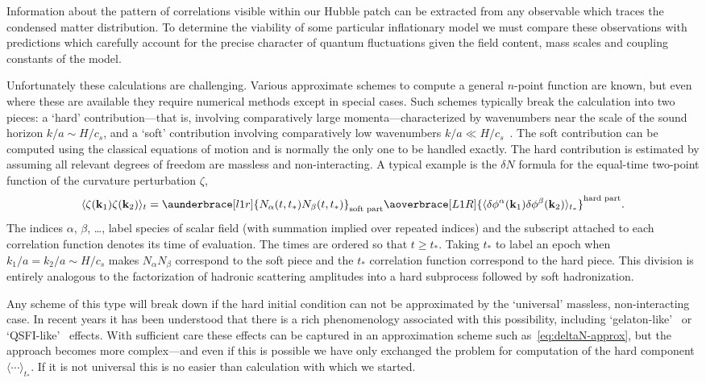 \documentclass[11pt,a4paper]{article}
\newcommand{\vect}[1]{\bm{\mathrm{{#1}}}}
\renewcommand{\geq}{\geqslant}
\begin{document}
Information about the pattern of correlations visible within our Hubble patch
can be extracted from any observable which traces the condensed matter
distribution.
To determine the viability of some particular inflationary model
we must compare these observations with predictions
which carefully account for the precise character of quantum
fluctuations given the field content, mass scales and coupling constants of the model.

Unfortunately these calculations are challenging.
Various
approximate schemes to compute a general $n$-point function are known,
but even where these are available they require numerical methods
except in special cases.
Such schemes typically break the calculation into two pieces:
a `hard' contribution---that is, involving comparatively
large momenta---characterized by wavenumbers near the scale
of the sound horizon $k/a \sim H / c_s$,
and a `soft' contribution involving comparatively low wavenumbers
$k/a \ll H / c_s$~\cite{Dias:2012qy}.
The soft contribution can be computed using the classical
equations of motion and is normally the only one to be handled exactly.
The hard contribution is estimated by assuming
all relevant degrees of freedom are massless and non-interacting.
A typical example is the $\delta N$ formula for the
equal-time two-point function
of the curvature perturbation $\zeta$,
\begin{equation}
    \langle \zeta(\vect{k}_1) \zeta(\vect{k}_2) \rangle_t
    = \aunderbrace[l1r]{N_\alpha(t, t_\ast) N_\beta(t, t_\ast)}_{\text{soft part}}
    \aoverbrace[L1R]{\langle \delta\phi^\alpha(\vect{k}_1) \delta\phi^\beta(\vect{k}_2) \rangle_{t_\ast}}^{\text{hard part}} .
    \label{eq:deltaN-approx}
\end{equation}
The indices $\alpha$, $\beta$, \ldots, label species of scalar
field (with summation implied over repeated indices)
and the subscript attached to each correlation function
denotes its time of evaluation.
The times are ordered so that $t \geq t_\ast$.
Taking $t_\ast$ to label an epoch when
$k_1 / a = k_2 / a \sim H / c_s$
makes $N_\alpha N_\beta$
correspond to the soft piece
and the $t_\ast$ correlation function
correspond to the hard piece.
This division is entirely analogous to the factorization
of hadronic scattering amplitudes into a hard subprocess
followed by soft hadronization.

Any scheme of this type will break down if the
hard initial condition
can not be approximated by the `universal'
massless, non-interacting case.
In recent years it has been understood that there is
a rich phenomenology associated with this possibility,
including `gelaton-like'~\cite{Tolley:2009fg}
or
`QSFI-like'~\cite{Chen:2009we,Chen:2009zp,Chen:2012ge}
effects.
With sufficient care these effects can be captured
in an approximation scheme such as~\eqref{eq:deltaN-approx},
but the approach becomes more complex---and
even if this is possible we have only exchanged the problem
for computation of the hard
component
$\langle \cdots \rangle_{t_\ast}$.
If it is not universal
this is
no easier than
calculation with which we started.
\end{document}
